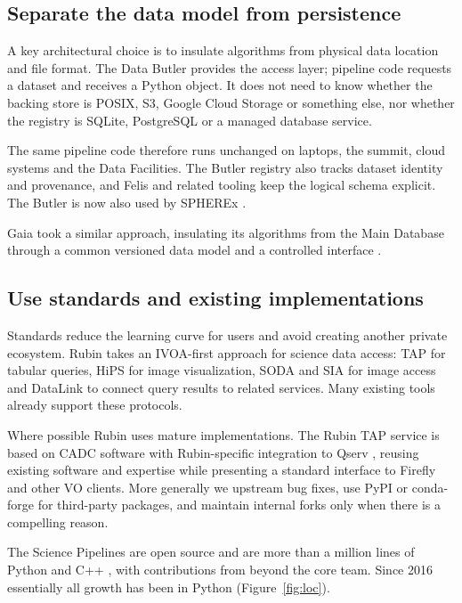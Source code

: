 \subsection{Separate the data model from persistence}
\label{sec:butler}

A key architectural choice is to insulate algorithms from physical data location and file format.
The Data Butler \citep{2022SPIE12189E..11J} provides the access layer; pipeline code requests a dataset and receives a Python object.
It does not need to know whether the backing store is POSIX, S3, Google Cloud Storage or something else, nor whether the registry is SQLite, PostgreSQL or a managed database service.

The same pipeline code therefore runs unchanged on laptops, the summit, cloud systems and the Data Facilities.
The Butler registry also tracks dataset identity and provenance, and Felis \citep{2024arXiv241209721M} and related tooling keep the logical schema explicit.
The Butler is now also used by SPHEREx \citep{2026ApJS..285...67A}.

Gaia took a similar approach, insulating its algorithms from the Main Database through a common versioned data model and a controlled interface \citep{2011ExA....31..215O}.

\subsection{Use standards and existing implementations}
\label{sec:standards}

Standards reduce the learning curve for users and avoid creating another private ecosystem.
Rubin takes an IVOA-first approach for science data access: TAP for tabular queries, HiPS for image visualization, SODA and SIA for image access and DataLink to connect query results to related services.
Many existing tools already support these protocols.

Where possible Rubin uses mature implementations.
The Rubin TAP \citep{2011arXiv1110.0497D} service is based on CADC software with Rubin-specific integration to Qserv \citep{2025ASPC..538..114M}, reusing existing software and expertise while presenting a standard interface to Firefly \citep{2016SPIE.9913E..0YR} and other VO clients.
More generally we upstream bug fixes, use PyPI or conda-forge for third-party packages, and maintain internal forks only when there is a compelling reason.

The Science Pipelines are open source and are more than a million lines of Python and C++ \citep{2018SPIE10707E..09J}, with contributions from beyond the core team.
Since 2016 essentially all growth has been in Python (Figure~\ref{fig:loc}).

